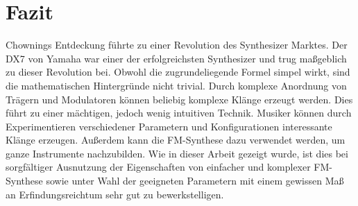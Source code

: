 \section{Fazit}

Chownings Entdeckung führte zu einer Revolution des Synthesizer Marktes. Der DX7 von Yamaha war einer der erfolgreichsten Synthesizer und trug maßgeblich zu dieser Revolution bei. Obwohl die zugrundeliegende Formel simpel wirkt, sind die mathematischen Hintergründe nicht trivial. Durch komplexe Anordnung von Trägern und Modulatoren können beliebig komplexe Klänge erzeugt werden. Dies führt zu einer mächtigen, jedoch wenig intuitiven Technik. Musiker können durch Experimentieren verschiedener Parametern und Konfigurationen interessante Klänge erzeugen. Außerdem kann die FM-Synthese dazu verwendet werden, um ganze Instrumente nachzubilden.
Wie in dieser Arbeit gezeigt wurde, ist dies bei sorgfältiger Ausnutzung der Eigenschaften von einfacher und komplexer FM-Synthese sowie unter Wahl der geeigneten Parametern mit einem gewissen Maß an Erfindungsreichtum sehr gut zu bewerkstelligen.